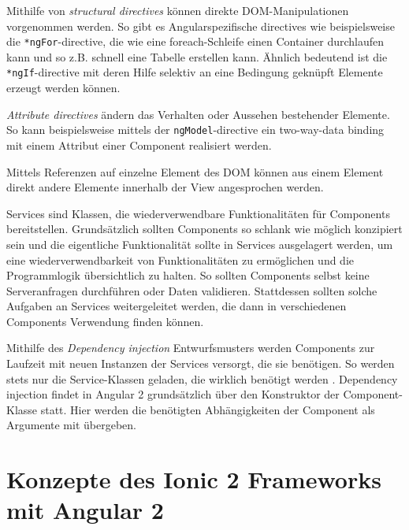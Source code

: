 Mithilfe von \emph{structural directives} können direkte DOM-Manipulationen vorgenommen werden. So gibt es Angularspezifische directives wie beispielsweise die  \texttt{*ngFor}-directive, die wie eine foreach-Schleife einen Container durchlaufen kann und so z.B. schnell eine Tabelle erstellen kann. Ähnlich bedeutend ist die \texttt{*ngIf}-directive mit deren Hilfe selektiv an eine Bedingung geknüpft Elemente erzeugt werden können.

\emph{Attribute directives} ändern das Verhalten oder Aussehen bestehender Elemente. So kann beispielsweise mittels der \texttt{ngModel}-directive ein two-way-data binding mit einem Attribut einer Component realisiert werden. 
%

Mittels Referenzen auf einzelne Element des DOM können aus einem Element direkt andere Elemente innerhalb der View angesprochen werden.

Services sind Klassen, die wiederverwendbare Funktionalitäten für Components bereitstellen. Grundsätzlich sollten Components so schlank wie möglich konzipiert sein und die eigentliche Funktionalität sollte in Services ausgelagert werden, um eine wiederverwendbarkeit von Funktionalitäten zu ermöglichen und die Programmlogik übersichtlich zu halten. So sollten Components selbst keine Serveranfragen durchführen oder Daten validieren. Stattdessen sollten solche Aufgaben an Services weitergeleitet werden, die dann in verschiedenen Components Verwendung finden können.
%

Mithilfe des \emph{Dependency injection} Entwurfsmusters \cite{angularDependencyInjectionDoku} werden Components zur Laufzeit mit neuen Instanzen der Services versorgt, die sie benötigen. So werden stets nur die Service-Klassen geladen, die wirklich benötigt werden \cite{angularDocuBasicArchitecture}. Dependency injection findet in Angular 2 grundsätzlich über den Konstruktor der Component-Klasse statt. Hier werden die benötigten Abhängigkeiten der Component als Argumente mit übergeben.
%
%
\section{Konzepte des Ionic 2 Frameworks mit Angular 2}
\label{sec:ionicKonzepte}

